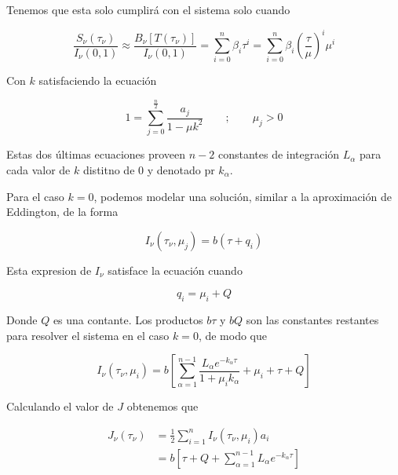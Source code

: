 \documentclass[10pt,spanish,a4paper]{practice}
\begin{document}
\begin{problem}
\begin{solution}
            Tenemos que esta solo cumplirá con el sistema solo cuando

            \begin{equation*}
                \frac{S_\nu(\tau_\nu)}{I_\nu(0, 1)} \approx \frac{B_\nu[T(\tau_\nu)]}{I_\nu(0, 1)} = \sum_{i=0}^{n}\beta_i\tau^i = \sum_{i=0}^{n}\beta_i\left(\frac{\tau}{\mu}\right)^i\mu^{i}
            \end{equation*}

            Con $k$ satisfaciendo la ecuación

            \begin{equation*}
                1 = \sum_{j=0}^{\frac{n}{2}}\frac{a_j}{1 - \mu k^2} \qquad ; \qquad \mu_j > 0
            \end{equation*}

            Estas dos últimas ecuaciones proveen $n-2$ constantes de integración $L_\alpha$ para cada valor de $k$ distitno de 0 y denotado pr $k_\alpha$.

            Para el caso $k=0$, podemos modelar una solución, similar a la aproximación de Eddington, de la forma

            \begin{equation*}
                I_{\nu}\left(\tau_{\nu}, \mu_j\right) = b(\tau + q_i)
            \end{equation*}

            Esta expresion de $I_{\nu}$ satisface la ecuación cuando

            \begin{equation*}
                q_i = \mu_i + Q
            \end{equation*}

            Donde $Q$ es una contante. Los productos $b\tau$ y $bQ$ son las constantes restantes para resolver el sistema en el caso $k=0$, de modo que

            \begin{equation*}
                I_{\nu}\left(\tau_{\nu}, \mu_i\right) = b \left[\sum_{\alpha=1}^{n-1}\frac{L_\alpha e^{-k_\alpha\tau}}{1 + \mu_i k_\alpha} + \mu_i + \tau + Q\right]
            \end{equation*}

            Calculando el valor de $J$ obtenemos que

            \begin{align*}
                J_\nu\left(\tau_\nu\right) &= \frac{1}{2}\sum_{i=1}^{n}I_{\nu}\left(\tau_{\nu}, \mu_i\right)a_i \\
                  &= b \left[\tau + Q + \sum_{\alpha=1}^{n-1}L_\alpha e^{-k_\alpha\tau}\right]
            \end{align*}


\end{solution}
\end{problem}
\end{document}

